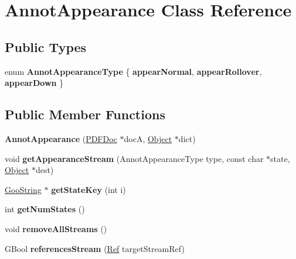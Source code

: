 \hypertarget{class_annot_appearance}{}\section{Annot\+Appearance Class Reference}
\label{class_annot_appearance}
\subsection*{Public Types}
\begin{DoxyCompactItemize}
\item 
\mbox{\label{class_annot_appearance_ad90eeefb0bfa237187faf577a35cf090}} 
enum {\bfseries Annot\+Appearance\+Type} \{ {\bfseries appear\+Normal}, 
{\bfseries appear\+Rollover}, 
{\bfseries appear\+Down}
 \}
\end{DoxyCompactItemize}
\subsection*{Public Member Functions}
\begin{DoxyCompactItemize}
\item 
\mbox{\label{class_annot_appearance_ad9c68fef8c071935cb4922208e54e621}} 
{\bfseries Annot\+Appearance} (\hyperlink{class_p_d_f_doc}{P\+D\+F\+Doc} $\ast$docA, \hyperlink{class_object}{Object} $\ast$dict)
\item 
\mbox{\label{class_annot_appearance_abcc38c537116a8b5f2268a07102db07e}} 
void {\bfseries get\+Appearance\+Stream} (Annot\+Appearance\+Type type, const char $\ast$state, \hyperlink{class_object}{Object} $\ast$dest)
\item 
\mbox{\label{class_annot_appearance_acdebf8acf85219048ca15e4efe13b477}} 
\hyperlink{class_goo_string}{Goo\+String} $\ast$ {\bfseries get\+State\+Key} (int i)
\item 
\mbox{\label{class_annot_appearance_a5fbcf50bd59a74c12606e82bb85639e3}} 
int {\bfseries get\+Num\+States} ()
\item 
\mbox{\label{class_annot_appearance_a63cd4a4f733ae52fd86e05f28d1b11d9}} 
void {\bfseries remove\+All\+Streams} ()
\item 
\mbox{\label{class_annot_appearance_abc6810830f9255f3c59c820a0cd0fa19}} 
G\+Bool {\bfseries references\+Stream} (\hyperlink{struct_ref}{Ref} target\+Stream\+Ref)
\end{DoxyCompactItemize}
